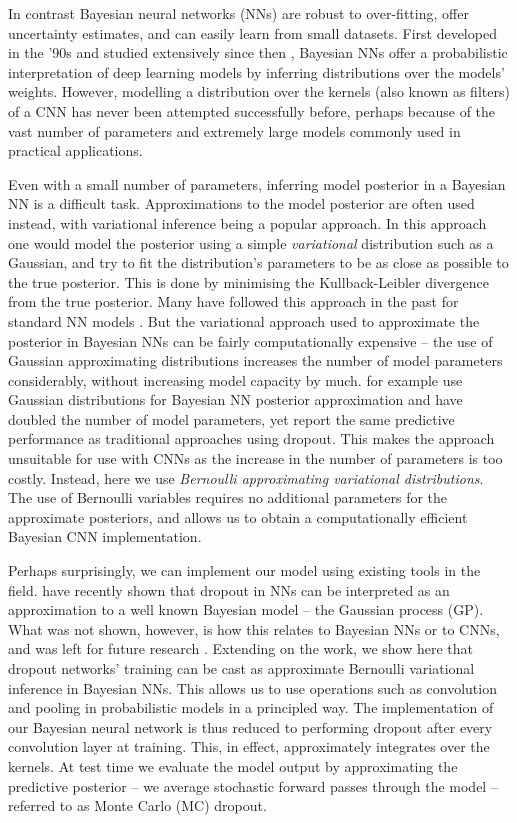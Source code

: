  In contrast Bayesian neural networks (NNs) are robust to over-fitting, offer uncertainty estimates, and can easily learn from small datasets. First developed in the '90s and studied extensively since then \citep{mackay1992practical, neal1995bayesian}, Bayesian NNs offer a probabilistic interpretation of deep learning models by inferring distributions over the models' weights. 
However, modelling a distribution over the kernels (also known as filters) of a CNN has never been attempted successfully before, perhaps because of the vast number of parameters and extremely large models commonly used in practical applications. 

Even with a small number of parameters, inferring model posterior in a Bayesian NN is a difficult task. Approximations to the model posterior are often used instead, with variational inference being a popular approach. In this approach one would model the posterior using a simple \textit{variational} distribution such as a Gaussian, and try to fit the distribution's parameters to be as close as possible to the true posterior. This is done by minimising the Kullback-Leibler divergence from the true posterior. Many have followed this approach in the past for standard NN models \citep{hinton1993keeping,barber1998ensemble,graves2011practical,blundell2015weight}.
But the variational approach used to approximate the posterior in Bayesian NNs can be fairly computationally expensive -- the use of Gaussian approximating distributions increases the number of model parameters considerably, without increasing model capacity by much. \citet{blundell2015weight} for example use Gaussian distributions for Bayesian NN posterior approximation and have doubled the number of model parameters, yet report the same predictive performance as traditional approaches using dropout. This makes the approach unsuitable for use with CNNs as the increase in the number of parameters is too costly.
Instead, here we use \textit{Bernoulli approximating variational distributions}.
The use of Bernoulli variables requires no additional parameters for the approximate posteriors, and allows us to obtain a computationally efficient Bayesian CNN implementation. 

Perhaps surprisingly, we can implement our model using existing tools in the field.
\citet{Gal2015Dropout} have recently shown that dropout in NNs can be interpreted as an approximation to a well known Bayesian model -- the Gaussian process (GP). 
What was not shown, however, is how this relates to Bayesian NNs or to CNNs, and was left for future research \citep[][appendix section 4.2]{Gal2015Dropout}. 
Extending on the work, we show here that dropout networks' training can be cast as approximate Bernoulli variational inference in Bayesian NNs. 
This allows us to use operations such as convolution and pooling in probabilistic models in a principled way. 
The implementation of our Bayesian neural network is thus reduced to performing dropout after every convolution layer at training. This, in effect, approximately integrates over the kernels. %
At test time we evaluate the model output by approximating the predictive posterior -- we average stochastic forward passes through the model -- referred to as Monte Carlo (MC) dropout. 

